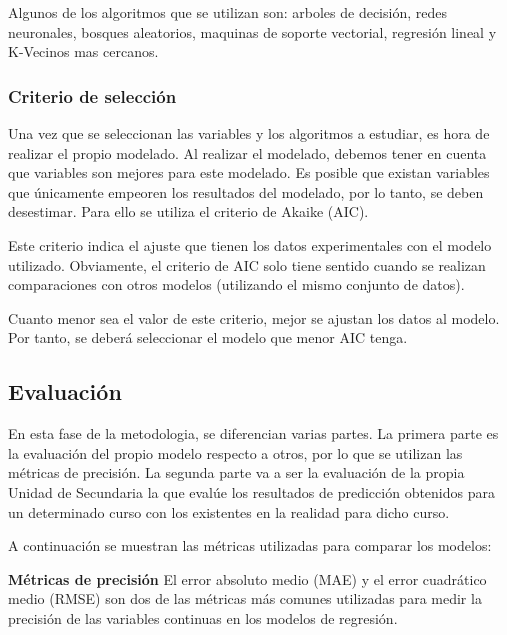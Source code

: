 Algunos de los algoritmos que se utilizan son: arboles de decisión, redes neuronales, bosques aleatorios, maquinas de soporte vectorial, regresión lineal y K-Vecinos mas cercanos.

\subsubsection{Criterio de selección}

Una vez que se seleccionan las variables y los algoritmos a estudiar, es hora de realizar el propio modelado. Al realizar el modelado, debemos tener en cuenta que variables son mejores para este modelado. Es posible que existan variables que únicamente empeoren los resultados del modelado, por lo tanto, se deben desestimar. Para ello se utiliza el criterio de Akaike (AIC). 

Este criterio indica el ajuste que tienen los datos experimentales con el modelo utilizado. Obviamente, el criterio de AIC solo tiene sentido cuando se realizan comparaciones con otros modelos (utilizando el mismo conjunto de datos). \cite{martinez2009criterio}

Cuanto menor sea el valor de este criterio, mejor se ajustan los datos al modelo. Por tanto, se deberá seleccionar el modelo que menor AIC tenga. \cite{martinez2009criterio}

\subsection{Evaluación}
En esta fase de la metodologia, se diferencian varias partes. La primera parte es la evaluación del propio modelo respecto a otros, por lo que se utilizan las métricas de precisión. La segunda parte va a ser la evaluación de la propia Unidad de Secundaria la que evalúe los resultados de predicción obtenidos para un determinado curso con los existentes en la realidad para dicho curso.

A continuación se muestran las métricas utilizadas para comparar los modelos:

\textbf{Métricas de precisión}
El error absoluto medio (MAE) y el error cuadrático medio (RMSE) son dos de las métricas más comunes utilizadas para medir la precisión de las variables continuas en los modelos de regresión.


